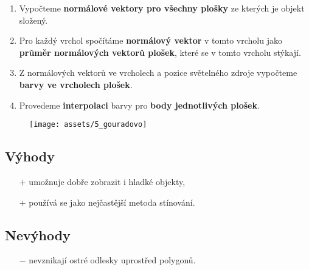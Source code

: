 \begin{enumerate}
    \item Vypočteme \textbf{normálové vektory pro všechny plošky} ze kterých je objekt složený.
    \item Pro každý vrchol spočítáme \textbf{normálový vektor} v tomto vrcholu jako \textbf{průměr normálových vektorů plošek}, které se v tomto vrcholu stýkají.
    \item Z normálových vektorů ve vrcholech a pozice světelného zdroje vypočteme \textbf{barvy ve vrcholech plošek}.
    \item Provedeme \textbf{interpolaci} barvy pro \textbf{body jednotlivých plošek}.
\end{enumerate}
\begin{figure}[H]
    \centering
    \texttt{[image: assets/5\_gouradovo]}
\end{figure}
\subsection*{Výhody}
\begin{itemize}
    \item[$+$] umožnuje dobře zobrazit i hladké objekty,
    \item[$+$] používá se jako nejčastější metoda stínování.
\end{itemize}
\subsection*{Nevýhody}
\begin{itemize}
    \item[$-$] nevznikají ostré odlesky uprostřed polygonů.
\end{itemize}
